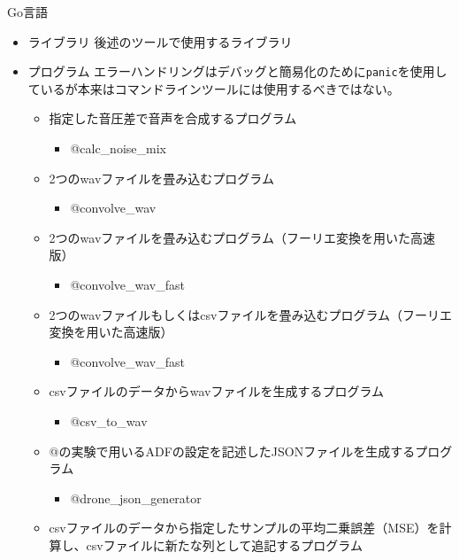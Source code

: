 Go言語

\begin{itemize}
\item
  ライブラリ 後述のツールで使用するライブラリ
\item
  プログラム
  エラーハンドリングはデバッグと簡易化のために\texttt{panic}を使用しているが本来はコマンドラインツールには使用するべきではない。

  \begin{itemize}
  \tightlist
  \item
    指定した音圧差で音声を合成するプログラム

    \begin{itemize}
    \tightlist
    \item
      @calc\_noise\_mix
    \end{itemize}
  \item
    2つのwavファイルを畳み込むプログラム

    \begin{itemize}
    \tightlist
    \item
      @convolve\_wav
    \end{itemize}
  \item
    2つのwavファイルを畳み込むプログラム（フーリエ変換を用いた高速版）

    \begin{itemize}
    \tightlist
    \item
      @convolve\_wav\_fast
    \end{itemize}
  \item
    2つのwavファイルもしくはcsvファイルを畳み込むプログラム（フーリエ変換を用いた高速版）

    \begin{itemize}
    \tightlist
    \item
      @convolve\_wav\_fast
    \end{itemize}
  \item
    csvファイルのデータからwavファイルを生成するプログラム

    \begin{itemize}
    \tightlist
    \item
      @csv\_to\_wav
    \end{itemize}
  \item
    @の実験で用いるADFの設定を記述したJSONファイルを生成するプログラム

    \begin{itemize}
    \tightlist
    \item
      @drone\_json\_generator
    \end{itemize}
  \item
    csvファイルのデータから指定したサンプルの平均二乗誤差（MSE）を計算し、csvファイルに新たな列として追記するプログラム


\end{itemize}
\end{itemize}

